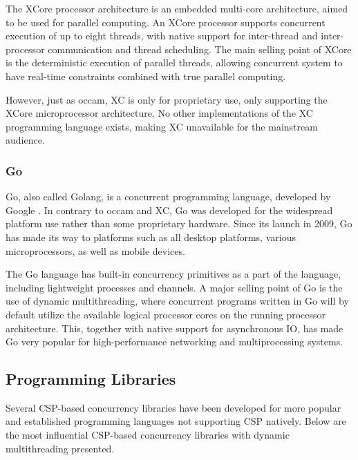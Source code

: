 The XCore processor architecture is an embedded multi\hyp{}core architecture, aimed to be used for parallel computing. An XCore processor supports concurrent execution of up to eight threads, with native support for inter\hyp{}thread and inter\hyp{}processor communication and thread scheduling. The main selling point of XCore is the deterministic execution of parallel threads, allowing concurrent system to have real\hyp{}time constraints combined with true parallel computing.

However, just as occam, XC is only for proprietary use, only supporting the XCore microprocessor architecture. No other implementations of the XC programming language exists, making XC unavailable for the mainstream audience.


\subsubsection{Go}


Go, also called Golang, is a concurrent programming language, developed by Google \citep{balbaert2012way}. In contrary to occam and XC, Go was developed for the widespread platform use rather than some proprietary hardware. Since its launch in 2009, Go has made its way to platforms such as all desktop platforms, various microprocessors, as well as mobile devices. 

The Go language has built\hyp{}in concurrency primitives as a part of the language, including lightweight processes and channels. A major selling point of Go is the use of dynamic multithreading, where concurrent programs written in Go will by default utilize the available logical processor cores on the running processor architecture. This, together with native support for asynchronous IO, has made Go very popular for high\hyp{}performance networking and multiprocessing systems.


\subsection{Programming Libraries}


Several CSP\hyp{}based concurrency libraries have been developed for more popular and established programming languages not supporting CSP natively. Below are the most influential CSP\hyp{}based concurrency libraries with dynamic multithreading presented.


